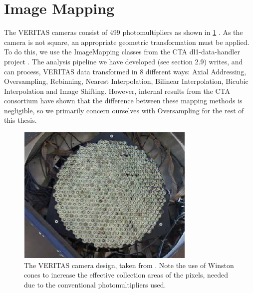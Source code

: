 \section{Image Mapping}
The VERITAS cameras consist of 499 photomultipliers as shown in \ref{fig:verc} \cite{vercam}.
As the camera is not square, an appropriate geometric transformation must be applied. To do this, we use the ImageMapping classes from the CTA dl1-data-handler project \cite{dl1dh}. The analysis pipeline we have developed (see section 2.9) writes, and can process, VERITAS data transformed in 8 different ways: Axial Addressing, Oversampling, Rebinning, Nearest Interpolation, Bilinear Interpolation, Bicubic Interpolation and Image Shifting. However, internal results from the CTA consortium have shown that the difference between these mapping methods is negligible, so we primarily concern ourselves with Oversampling for the rest of this thesis.
\begin{figure}[h]
        \begin{center}
        \includegraphics[width=0.6\columnwidth]{figures/verc.png}

        \caption{
                \label{fig:verc} 
                The VERITAS camera design, taken from \cite{vercam}. Note the use of Winston cones to increase the effective collection areas of the pixels, needed due to the conventional photomultipliers used.
        }
        \end{center}
\end{figure}


